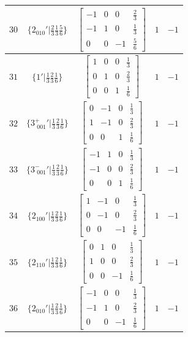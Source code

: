\documentclass[fleqn,8pt]{jsarticle}
\begin{document}
\begin{longtable}{ccccc}
$ 30 $ & $ \{2{}_{010}{}'|\frac{2}{3} \frac{1}{3} \frac{5}{6}\} $ & $ \begin{bmatrix} -1 & 0 & 0 & \frac{2}{3} \\ -1 & 1 & 0 & \frac{1}{3} \\ 0 & 0 & -1 & \frac{5}{6} \end{bmatrix} $ & $ 1 $ & $ -1 $ \\ \hline
$ 31 $ & $ \{1{}'|\frac{1}{3} \frac{2}{3} \frac{1}{6}\} $ & $ \begin{bmatrix} 1 & 0 & 0 & \frac{1}{3} \\ 0 & 1 & 0 & \frac{2}{3} \\ 0 & 0 & 1 & \frac{1}{6} \end{bmatrix} $ & $ 1 $ & $ -1 $ \\ \hline
$ 32 $ & $ \{3^{+}_{\,\,001}{}'|\frac{1}{3} \frac{2}{3} \frac{1}{6}\} $ & $ \begin{bmatrix} 0 & -1 & 0 & \frac{1}{3} \\ 1 & -1 & 0 & \frac{2}{3} \\ 0 & 0 & 1 & \frac{1}{6} \end{bmatrix} $ & $ 1 $ & $ -1 $ \\ \hline
$ 33 $ & $ \{3^{-}_{\,\,001}{}'|\frac{1}{3} \frac{2}{3} \frac{1}{6}\} $ & $ \begin{bmatrix} -1 & 1 & 0 & \frac{1}{3} \\ -1 & 0 & 0 & \frac{2}{3} \\ 0 & 0 & 1 & \frac{1}{6} \end{bmatrix} $ & $ 1 $ & $ -1 $ \\ \hline
$ 34 $ & $ \{2{}_{100}{}'|\frac{1}{3} \frac{2}{3} \frac{1}{6}\} $ & $ \begin{bmatrix} 1 & -1 & 0 & \frac{1}{3} \\ 0 & -1 & 0 & \frac{2}{3} \\ 0 & 0 & -1 & \frac{1}{6} \end{bmatrix} $ & $ 1 $ & $ -1 $ \\ \hline
$ 35 $ & $ \{2{}_{110}{}'|\frac{1}{3} \frac{2}{3} \frac{1}{6}\} $ & $ \begin{bmatrix} 0 & 1 & 0 & \frac{1}{3} \\ 1 & 0 & 0 & \frac{2}{3} \\ 0 & 0 & -1 & \frac{1}{6} \end{bmatrix} $ & $ 1 $ & $ -1 $ \\ \hline
$ 36 $ & $ \{2{}_{010}{}'|\frac{1}{3} \frac{2}{3} \frac{1}{6}\} $ & $ \begin{bmatrix} -1 & 0 & 0 & \frac{1}{3} \\ -1 & 1 & 0 & \frac{2}{3} \\ 0 & 0 & -1 & \frac{1}{6} \end{bmatrix} $ & $ 1 $ & $ -1 $ \\
\end{longtable}
\end{document}
